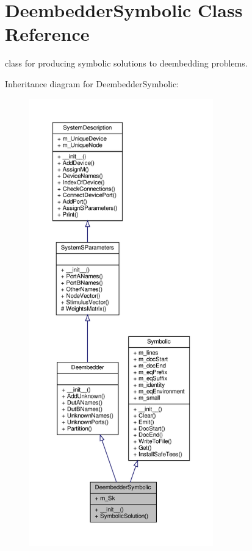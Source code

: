 \hypertarget{classSignalIntegrity_1_1SystemDescriptions_1_1DeembedderSymbolic_1_1DeembedderSymbolic}{}\section{Deembedder\+Symbolic Class Reference}
\label{classSignalIntegrity_1_1SystemDescriptions_1_1DeembedderSymbolic_1_1DeembedderSymbolic}


class for producing symbolic solutions to deembedding problems.  




Inheritance diagram for Deembedder\+Symbolic\+:\nopagebreak
\begin{figure}[H]
\begin{center}
\leavevmode
\includegraphics[height=550pt]{classSignalIntegrity_1_1SystemDescriptions_1_1DeembedderSymbolic_1_1DeembedderSymbolic__inherit__graph}
\end{center}
\end{figure}


